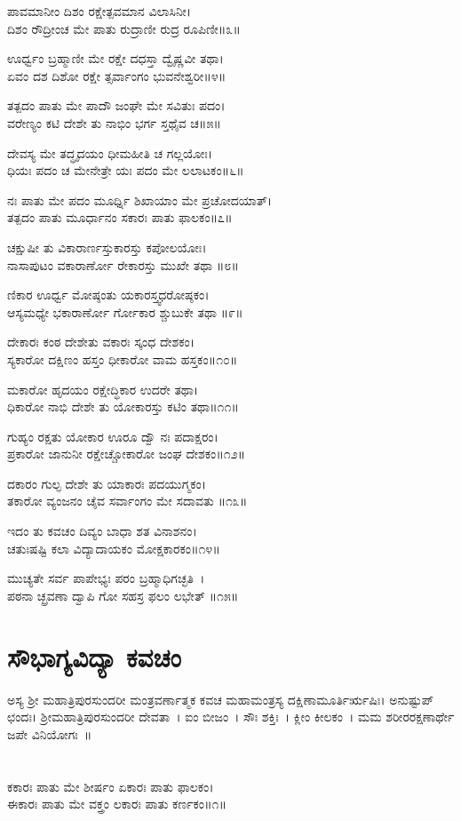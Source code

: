 ಪಾವಮಾನೀಂ ದಿಶಂ ರಕ್ಷೇತ್ಪವಮಾನ ವಿಲಾಸಿನೀ।\\
ದಿಶಂ ರೌದ್ರೀಂಚ ಮೇ ಪಾತು ರುದ್ರಾಣೀ ರುದ್ರ ರೂಪಿಣೀ॥೩॥

ಊರ್ಧ್ವಂ ಬ್ರಹ್ಮಾಣೀ ಮೇ ರಕ್ಷೇ ದಧಸ್ತಾ ದ್ವೈಷ್ಣವೀ ತಥಾ।\\
ಏವಂ ದಶ ದಿಶೋ ರಕ್ಷೇ ತ್ಸರ್ವಾಂಗಂ ಭುವನೇಶ್ವರೀ॥೪॥

ತತ್ಪದಂ ಪಾತು ಮೇ ಪಾದೌ ಜಂಘೇ ಮೇ ಸವಿತುಃ ಪದಂ।\\
ವರೇಣ್ಯಂ ಕಟಿ ದೇಶೇ ತು ನಾಭಿಂ ಭರ್ಗ ಸ್ತಥೈವ ಚ॥೫॥

ದೇವಸ್ಯ ಮೇ ತದ್ಧೃದಯಂ ಧೀಮಹೀತಿ ಚ ಗಲ್ಲಯೋಃ।\\
ಧಿಯಃ ಪದಂ ಚ ಮೇನೇತ್ರೇ ಯಃ ಪದಂ ಮೇ ಲಲಾಟಕಂ॥೬॥

ನಃ ಪಾತು ಮೇ ಪದಂ ಮೂರ್ಧ್ನಿ ಶಿಖಾಯಾಂ ಮೇ ಪ್ರಚೋದಯಾತ್।\\
ತತ್ಪದಂ ಪಾತು ಮೂರ್ಧಾನಂ ಸಕಾರಃ ಪಾತು ಫಾಲಕಂ॥೭॥

ಚಕ್ಷುಷೀ ತು ವಿಕಾರಾರ್ಣಸ್ತುಕಾರಸ್ತು ಕಪೋಲಯೋಃ।\\
ನಾಸಾಪುಟಂ ವಕಾರಾರ್ಣೋ ರೇಕಾರಸ್ತು ಮುಖೇ ತಥಾ ॥೮॥

ಣಿಕಾರ ಊರ್ಧ್ವ ಮೋಷ್ಠಂತು ಯಕಾರಸ್ತ್ವಧರೋಷ್ಠಕಂ।\\
ಆಸ್ಯಮಧ್ಯೇ ಭಕಾರಾರ್ಣೋ ರ್ಗೋಕಾರ ಶ್ಚುಬುಕೇ ತಥಾ ॥೯॥

ದೇಕಾರಃ ಕಂಠ ದೇಶೇತು ವಕಾರಃ ಸ್ಕಂಧ ದೇಶಕಂ।\\
ಸ್ಯಕಾರೋ ದಕ್ಷಿಣಂ ಹಸ್ತಂ ಧೀಕಾರೋ ವಾಮ ಹಸ್ತಕಂ॥೧೦॥

ಮಕಾರೋ ಹೃದಯಂ ರಕ್ಷೇದ್ಧಿಕಾರ ಉದರೇ ತಥಾ।\\
ಧಿಕಾರೋ ನಾಭಿ ದೇಶೇ ತು ಯೋಕಾರಸ್ತು ಕಟಿಂ ತಥಾ॥೧೧॥

ಗುಹ್ಯಂ ರಕ್ಷತು ಯೋಕಾರ ಊರೂ ದ್ವೌ ನಃ ಪದಾಕ್ಷರಂ।\\
ಪ್ರಕಾರೋ ಜಾನುನೀ ರಕ್ಷೇಚ್ಚೋಕಾರೋ ಜಂಘ ದೇಶಕಂ॥೧೨॥

ದಕಾರಂ ಗುಲ್ಫ ದೇಶೇ ತು ಯಾಕಾರಃ ಪದಯುಗ್ಮಕಂ।\\
ತಕಾರೋ ವ್ಯಂಜನಂ ಚೈವ ಸರ್ವಾಂಗಂ ಮೇ ಸದಾವತು ॥೧೩॥

ಇದಂ ತು ಕವಚಂ ದಿವ್ಯಂ ಬಾಧಾ ಶತ ವಿನಾಶನಂ।\\
ಚತುಃಷಷ್ಟಿ ಕಲಾ ವಿದ್ಯಾದಾಯಕಂ ಮೋಕ್ಷಕಾರಕಂ॥೧೪॥

ಮುಚ್ಯತೇ ಸರ್ವ ಪಾಪೇಭ್ಯಃ ಪರಂ ಬ್ರಹ್ಮಾಧಿಗಚ್ಛತಿ~।\\
ಪಠನಾ ಚ್ಛ್ರವಣಾ ದ್ವಾಪಿ ಗೋ ಸಹಸ್ರ ಫಲಂ ಲಭೇತ್ ॥೧೫॥

\section{ಸೌಭಾಗ್ಯವಿದ್ಯಾ ಕವಚಂ}
ಅಸ್ಯ ಶ್ರೀ ಮಹಾತ್ರಿಪುರಸುಂದರೀ ಮಂತ್ರವರ್ಣಾತ್ಮಕ ಕವಚ ಮಹಾಮಂತ್ರಸ್ಯ ದಕ್ಷಿಣಾಮೂರ್ತಿರ್ಋಷಿಃ। ಅನುಷ್ಟುಪ್ ಛಂದಃ। ಶ್ರೀಮಹಾತ್ರಿಪುರಸುಂದರೀ ದೇವತಾ~। ಐಂ ಬೀಜಂ~। ಸೌಃ ಶಕ್ತಿಃ~। ಕ್ಲೀಂ ಕೀಲಕಂ~। ಮಮ ಶರೀರರಕ್ಷಣಾರ್ಥೇ ಜಪೇ ವಿನಿಯೋಗಃ~॥\\
\\
\\
ಕಕಾರಃ ಪಾತು ಮೇ ಶೀರ್ಷಂ ಏಕಾರಃ ಪಾತು ಫಾಲಕಂ।\\
ಈಕಾರಃ ಪಾತು ಮೇ ವಕ್ತ್ರಂ ಲಕಾರಃ ಪಾತು ಕರ್ಣಕಂ॥೧॥

